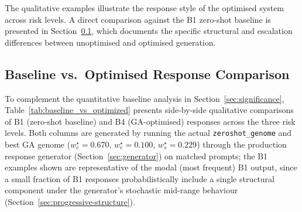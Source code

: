 \documentclass[mathematics,article,xetex,moreauthors]{Definitions/mdpi}
\begin{document}
The qualitative examples illustrate the response style of the optimised
system across risk levels. A direct comparison against the B1 zero-shot
baseline is presented in Section~\ref{sec:qualcomp}, which documents
the specific structural and escalation differences between unoptimised
and optimised generation.

\subsection{Baseline vs.\ Optimised Response Comparison}
\label{sec:qualcomp}

To complement the quantitative baseline analysis in
Section~\ref{sec:significance}, Table~\ref{tab:baseline_vs_optimized}
presents side-by-side qualitative comparisons of B1 (zero-shot baseline)
and B4 (GA-optimised) responses across the three risk levels. Both columns
are generated by running the actual \texttt{zeroshot\_genome} and best GA
genome ($w_c^{\star} = 0.670$, $w_e^{\star} = 0.100$, $w_s^{\star} = 0.229$)
through the production response generator (Section~\ref{sec:generator}) on
matched prompts; the B1 examples shown are representative of the modal
(most frequent) B1 output, since a small fraction of B1 responses
probabilistically include a single structural component under the
generator's stochastic mid-range behaviour (Section~\ref{sec:progressive-structure}).
\end{document}
